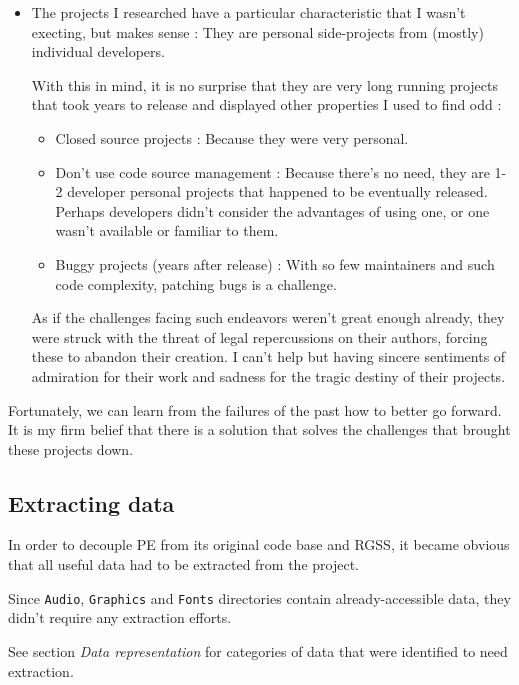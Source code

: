 \documentclass[11pt]{article}
\begin{document}
\begin{itemize}
	\item The projects I researched have a particular characteristic that I wasn't execting, but makes sense : They are personal side-projects from (mostly) individual developers. 
	
	With this in mind, it is no surprise that they are very long running projects that took years to release and displayed other properties I used to find odd :
	\begin{itemize}
		\item Closed source projects : Because they were very personal.
		\item Don't use code source management : Because there's no need, they are 1-2 developer personal projects that happened to be eventually released. Perhaps developers didn't consider the advantages of using one, or one wasn't available or familiar to them.
		\item Buggy projects (years after release) : With so few maintainers and such code complexity, patching bugs is a challenge.
	\end{itemize} 

	As if the challenges facing such endeavors weren't great enough already, they were struck with the threat of legal repercussions on their authors, forcing these to abandon their creation. I can't help but having sincere sentiments of admiration for their work and sadness for the tragic destiny of their projects.
\end{itemize}







Fortunately, we can learn from the failures of the past how to better go forward. It is my firm belief that there is a solution that solves the challenges that brought these projects down.


\subsection{Extracting data}

In order to decouple PE from its original code base and RGSS, it became obvious that all useful data had to be extracted from the project.

Since \verb|Audio|, \verb|Graphics| and \verb|Fonts| directories contain already-accessible data, they didn't require any extraction efforts.

See section \textit{Data representation} for categories of data that were identified to need extraction.
\end{document}
